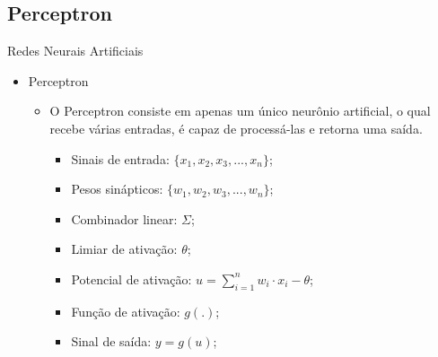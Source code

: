 \documentclass{libs/ufc_format}
\begin{document}
\subsection{Perceptron}

\begin{frame}{Redes Neurais Artificiais}
    \begin{itemize}
        \item Perceptron
            \begin{itemize}
                \justifying
                \item O Perceptron consiste em apenas um único neurônio artificial, o qual recebe várias entradas, é capaz de processá-las e retorna uma saída.\\
                    \begin{itemize}
                        \item<3-> Sinais de entrada: $\{x_{1}, x_{2}, x_{3}, ..., x_{n}\}$;
                        \item<4-> Pesos sinápticos: $\{w_{1}, w_{2}, w_{3}, ..., w_{n}\}$;
                        \item<5-> Combinador linear: $\Sigma$;
                        \item<6-> Limiar de ativação: $\theta$;
                        \item<7-> Potencial de ativação: $u = \sum\limits^{n}_{i=1}w_{i}\cdot x_{i} - \theta$;
                        \item<8-> Função de ativação: $g(.)$;
                        \item<9> Sinal de saída: $y = g(u)$;
                    \end{itemize}
            \end{itemize}
    \end{itemize}
\end{frame}
\end{document}
